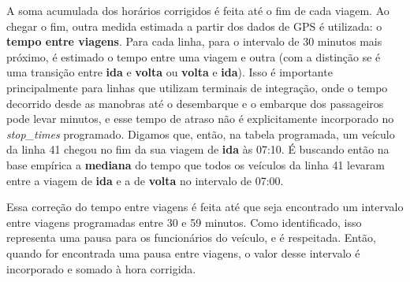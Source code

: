 \documentclass[        
    a4paper,          %
    12pt,             %
    chapter=TITLE,    %
    section=Title,    %
    subsection=Title, %
    oneside,          %
    english,          %
    spanish,          %
    brazil,           %
    fleqn             %
]{abntex2}
\begin{document}
  \begin{figure}[!h]
  \captionsetup{width=16cm}
  \centering
  \end{figure}
  
  A soma acumulada dos horários corrigidos é feita até o fim de cada viagem. Ao chegar o fim, outra medida estimada a partir dos dados de GPS é utilizada: o \textbf{tempo entre viagens}. Para cada linha, para o intervalo de 30 minutos mais próximo, é estimado o tempo entre uma viagem e outra (com a distinção se é uma transição entre \textbf{ida} e \textbf{volta} ou \textbf{volta} e \textbf{ida}). Isso é importante principalmente para linhas que utilizam terminais de integração, onde o tempo decorrido desde as manobras até o desembarque e o embarque dos passageiros pode levar minutos, e esse tempo de atraso não é explicitamente incorporado no \emph{stop\_times} programado. Digamos que, então, na tabela programada, um veículo da linha 41 chegou no fim da sua viagem de \textbf{ida} às 07:10. É buscando então na base empírica a \textbf{mediana} do tempo que todos os veículos da linha 41 levaram entre a viagem de \textbf{ida} e a de \textbf{volta} no intervalo de 07:00.
  
  Essa correção do tempo entre viagens é feita até que seja encontrado um intervalo entre viagens programadas entre 30 e 59 minutos. Como identificado, isso representa uma pausa para os funcionários do veículo, e é respeitada. Então, quando for encontrada uma pausa entre viagens, o valor desse intervalo é incorporado e somado à hora corrigida.
  
\end{document}
